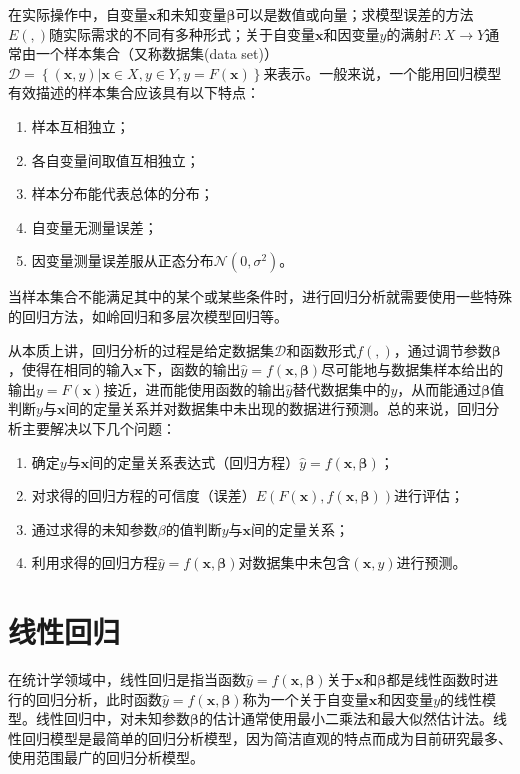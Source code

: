 \documentclass[a4paper]{ctexart}
\begin{document}
\begin{spacing}{1.3}
	在实际操作中，自变量$\bm{x}$和未知变量$\bm{\beta}$可以是数值或向量；求模型误差的方法$E(,)$随实际需求的不同有多种形式；关于自变量$\bm{x}$和因变量$y$的满射$F:X\rightarrow Y$通常由一个样本集合（又称数据集(data set)）$\mathcal{D}=\left\{ (\bm{x},y)|\bm{x}\in X,y\in Y,y=F(\bm{x}) \right\} $来表示。一般来说，一个能用回归模型有效描述的样本集合应该具有以下特点：
	\begin{enumerate}[itemindent=2em,label=(\arabic*)]
		\item 样本互相独立；
		\item 各自变量间取值互相独立；
		\item 样本分布能代表总体的分布；
		\item 自变量无测量误差；
		\item 因变量测量误差服从正态分布$\mathcal{N}(0,\sigma^2)$。
	\end{enumerate}
	当样本集合不能满足其中的某个或某些条件时，进行回归分析就需要使用一些特殊的回归方法，如岭回归和多层次模型回归等。
	
	从本质上讲，回归分析的过程是给定数据集$\mathcal{D}$和函数形式$f(,)$，通过调节参数$\bm{\beta}$，使得在相同的输入$\bm{x}$下，函数的输出$\hat{y}=f(\bm{x},\bm{\beta})$尽可能地与数据集样本给出的输出$y=F(\bm{x})$接近，进而能使用函数的输出$\hat{y}$替代数据集中的$y$，从而能通过$\bm{\beta}$值判断$y$与$\bm{x}$间的定量关系并对数据集中未出现的数据进行预测。总的来说，回归分析主要解决以下几个问题：
	\begin{enumerate}[itemindent=2em,label=(\arabic*)]
		\item 确定$y$与$\bm{x}$间的定量关系表达式（回归方程）$\hat{y}=f(\bm{x},\bm{\beta})$；
		\item 对求得的回归方程的可信度（误差）$E(F(\bm{x}),f(\bm{x},\bm{\beta}))$进行评估；
		\item 通过求得的未知参数$\beta$的值判断$y$与$\bm{x}$间的定量关系；
		\item 利用求得的回归方程$\hat{y}=f(\bm{x},\bm{\beta})$对数据集中未包含$(\bm{x},y)$进行预测。
	\end{enumerate}
	
	\section{线性回归}
	在统计学领域中，线性回归是指当函数$\hat{y}=f(\bm{x},\bm{\beta})$关于$\bm{x}$和$\bm{\beta}$都是线性函数时进行的回归分析，此时函数$\hat{y}=f(\bm{x},\bm{\beta})$称为一个关于自变量$\bm{x}$和因变量$y$的线性模型。线性回归中，对未知参数$\bm{\beta}$的估计通常使用最小二乘法和最大似然估计法。线性回归模型是最简单的回归分析模型，因为简洁直观的特点而成为目前研究最多、使用范围最广的回归分析模型。
	

\end{spacing}
\end{document}

